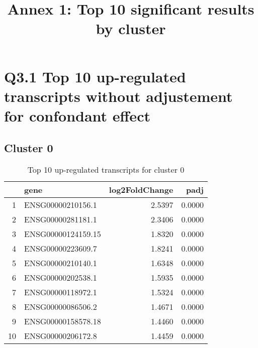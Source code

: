 \documentclass{article}
\begin{document}
\title{Annex 1: Top 10 significant results by cluster}
\maketitle
\tableofcontents
\newpage
\section{Q3.1 Top 10 up-regulated transcripts without adjustement for confondant effect}
\subsection{Cluster 0 }
\begin{table}[H]
\centering
\begin{tabular}{rlrr}
  \hline
 & gene & log2FoldChange & padj \\ 
  \hline
1 & ENSG00000210156.1 & 2.5397 & 0.0000 \\ 
  2 & ENSG00000281181.1 & 2.3406 & 0.0000 \\ 
  3 & ENSG00000124159.15 & 1.8320 & 0.0000 \\ 
  4 & ENSG00000223609.7 & 1.8241 & 0.0000 \\ 
  5 & ENSG00000210140.1 & 1.6348 & 0.0000 \\ 
  6 & ENSG00000202538.1 & 1.5935 & 0.0000 \\ 
  7 & ENSG00000118972.1 & 1.5324 & 0.0000 \\ 
  8 & ENSG00000086506.2 & 1.4671 & 0.0000 \\ 
  9 & ENSG00000158578.18 & 1.4460 & 0.0000 \\ 
  10 & ENSG00000206172.8 & 1.4459 & 0.0000 \\ 
   \hline
\end{tabular}
\caption{Top 10 up-regulated transcripts for cluster 0} 
\label{tab:q3_1_0}
\end{table}
\end{document}
